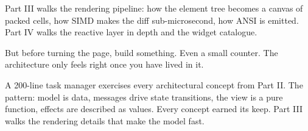 Part III walks the rendering pipeline: how the element tree
becomes a canvas of packed cells, how SIMD makes the diff
sub-microsecond, how ANSI is emitted. Part IV walks the
reactive layer in depth and the widget catalogue.

But before turning the page, build something. Even a small
counter. The architecture only feels right once you have lived
in it.

\begin{recap}
A 200-line task manager exercises every architectural concept
from Part II. The pattern: model is data, messages drive state
transitions, the view is a pure function, effects are described
as values. Every concept earned its keep. Part III walks the
rendering details that make the model fast.
\end{recap}
